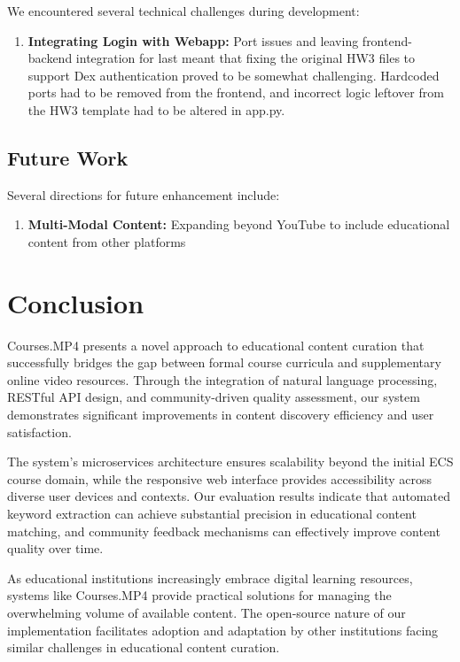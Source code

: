 \documentclass[manuscript,nonacm]{acmart}
\begin{document}
We encountered several technical challenges during development:
\begin{enumerate}
    \item \textbf{Integrating Login with Webapp:} Port issues and leaving frontend-backend integration for last meant that fixing the original HW3 files to support Dex authentication proved to be somewhat challenging. Hardcoded ports had to be removed from the frontend, and incorrect logic leftover from the HW3 template had to be altered in app.py.
\end{enumerate}

\subsection{Future Work}

Several directions for future enhancement include:

\begin{enumerate}
    \item \textbf{Multi-Modal Content:} Expanding beyond YouTube to include educational content from other platforms
\end{enumerate}

\section{Conclusion}

Courses.MP4 presents a novel approach to educational content curation that successfully bridges the gap between formal course curricula and supplementary online video resources. Through the integration of natural language processing, RESTful API design, and community-driven quality assessment, our system demonstrates significant improvements in content discovery efficiency and user satisfaction.

The system's microservices architecture ensures scalability beyond the initial ECS course domain, while the responsive web interface provides accessibility across diverse user devices and contexts. Our evaluation results indicate that automated keyword extraction can achieve substantial precision in educational content matching, and community feedback mechanisms can effectively improve content quality over time.

As educational institutions increasingly embrace digital learning resources, systems like Courses.MP4 provide practical solutions for managing the overwhelming volume of available content. The open-source nature of our implementation facilitates adoption and adaptation by other institutions facing similar challenges in educational content curation.
\end{document}
